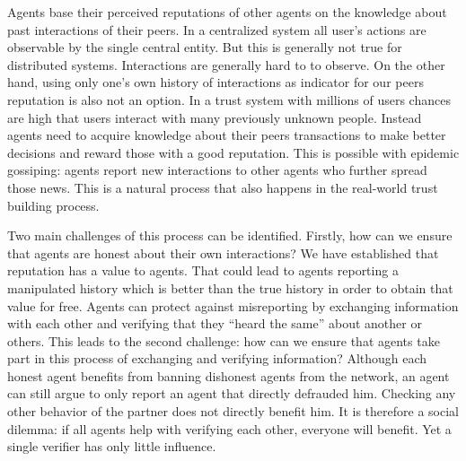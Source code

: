 Agents base their perceived reputations of other agents on the knowledge about past interactions of 
their peers. In a centralized system all user's actions are observable by the single central entity. 
But this is generally not true for distributed systems. Interactions are generally hard to to observe.
On the other hand, using only one's own history of interactions as indicator for our peers reputation
is also not an option. In a trust system with millions of users chances are high that users interact
with many previously unknown people. Instead agents need to acquire knowledge about their peers
transactions to make better decisions and reward those with a good reputation. This is possible with
epidemic gossiping: agents report new interactions to other agents who further spread those news. 
This is a natural process that also happens in the real-world trust building process.~\cite{nowak2005evolution}

Two main challenges of this process can be identified. Firstly, how can we ensure that agents are honest
about their own interactions? We have established that reputation has a value to agents. That could
lead to agents reporting a manipulated history which is better than the true history in order to 
obtain that value for free. Agents can protect against misreporting by exchanging information with 
each other and verifying that they ``heard the same'' about another or others. This leads to the 
second challenge: how can we ensure that agents take part in this process of exchanging and verifying
information? Although each honest agent benefits from banning dishonest agents from the network, an
agent can still argue to only report an agent that directly defrauded him. Checking any other 
behavior of the partner does not directly benefit him. It is therefore a social dilemma: if all 
agents help with verifying each other, everyone will benefit. Yet a single verifier has only little 
influence.


